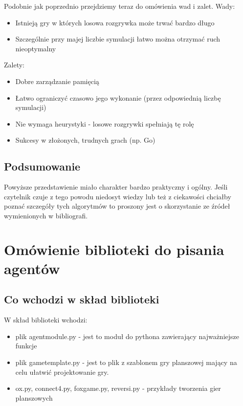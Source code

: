 \documentclass[declaration,shortabstract,inz]{iithesis}
\begin{document}
Podobnie jak poprzednio przejdziemy teraz do omówienia wad i zalet.
\newline Wady:
\begin{itemize}
  \item Istnieją gry w których losowa rozgrywka może trwać bardzo długo
  \item Szczególnie przy majej liczbie symulacji łatwo można otrzymać ruch nieoptymalny
\end{itemize}
Zalety:
\begin{itemize}
  \item Dobre zarządzanie pamięcią
  \item Łatwo ograniczyć czasowo jego wykonanie (przez odpowiednią liczbę symulacji)
  \item Nie wymaga heurystyki - losowe rozgrywki spełniają tę rolę
  \item Sukcesy w złożonych, trudnych grach (np. Go)
\end{itemize}

\section{Podsumowanie}
Powyższe przedstawienie miało charakter bardzo praktyczny i ogólny.
Jeśli czytelnik czuje z tego powodu niedosyt wiedzy lub też z ciekawości chciałby poznać szczegóły tych algorytmów to proszony jest o skorzystanie ze źródeł wymienionych w bibliografi.



\chapter{Omówienie biblioteki do pisania agentów}
\section{Co wchodzi w skład biblioteki}
W skład biblioteki wchodzi:
\begin{itemize}
  \item plik agent\textunderscore module.py - jest to moduł do pythona zawierający najważniejsze funkcje
  \item plik game\textunderscore template.py - jest to plik z szablonem gry planszowej mający na celu ułatwić projektowanie gry.
  \item ox.py, connect4.py, fox\textunderscore game.py, reversi.py - przykłady tworzenia gier planszowych
\end{itemize}
\end{document}
